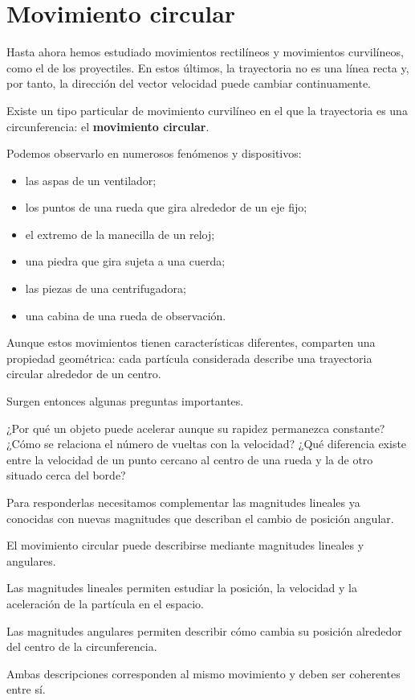 ﻿\section{Movimiento circular}

Hasta ahora hemos estudiado movimientos rectilíneos y movimientos curvilíneos,
como el de los proyectiles. En estos últimos, la trayectoria no es una línea
recta y, por tanto, la dirección del vector velocidad puede cambiar
continuamente.

Existe un tipo particular de movimiento curvilíneo en el que la trayectoria es
una circunferencia: el \textbf{movimiento circular}.

Podemos observarlo en numerosos fenómenos y dispositivos:

\begin{itemize}
    \item las aspas de un ventilador;
    \item los puntos de una rueda que gira alrededor de un eje fijo;
    \item el extremo de la manecilla de un reloj;
    \item una piedra que gira sujeta a una cuerda;
    \item las piezas de una centrifugadora;
    \item una cabina de una rueda de observación.
\end{itemize}

Aunque estos movimientos tienen características diferentes, comparten una
propiedad geométrica: cada partícula considerada describe una trayectoria
circular alrededor de un centro.

Surgen entonces algunas preguntas importantes.

¿Por qué un objeto puede acelerar aunque su rapidez permanezca constante?
¿Cómo se relaciona el número de vueltas con la velocidad? ¿Qué diferencia
existe entre la velocidad de un punto cercano al centro de una rueda y la de
otro situado cerca del borde?

Para responderlas necesitamos complementar las magnitudes lineales ya conocidas
con nuevas magnitudes que describan el cambio de posición angular.


\begin{idea}

El movimiento circular puede describirse mediante magnitudes lineales y
angulares.

Las magnitudes lineales permiten estudiar la posición, la velocidad y la
aceleración de la partícula en el espacio.

Las magnitudes angulares permiten describir cómo cambia su posición alrededor
del centro de la circunferencia.

Ambas descripciones corresponden al mismo movimiento y deben ser coherentes
entre sí.

\end{idea}



